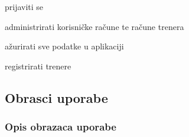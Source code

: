 \begin{packed_enum}
\begin{packed_enum}
			    \end{packed_enum}
		       
		        \item  {}
		        
		        \begin{packed_enum}
		        	
		        	\item prijaviti se
		        	\item administrirati korisničke račune te račune trenera
		        	\item ažurirati sve podatke u aplikaciji
		        	\item registrirati trenere
		        	
		        \end{packed_enum}

			\end{packed_enum}
			
			\eject 
			
			
				
			\subsection{Obrasci uporabe}
				
				
				\subsubsection{Opis obrazaca uporabe}
					

